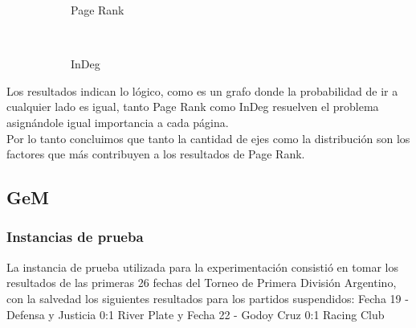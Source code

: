 \begin{figure}[H]
    \centering
    \begin{subfigure}[t]{0.5\textwidth}
      \begin{center}
        Page Rank\\
      \end{center}
    \end{subfigure}%
    ~
    \begin{subfigure}[t]{0.5\textwidth}
      \begin{center}
        InDeg\\
      \end{center}
    \end{subfigure}
\end{figure}

Los resultados indican lo lógico, como es un grafo donde la probabilidad de ir a cualquier lado es igual, tanto Page Rank como InDeg resuelven el problema asignándole igual importancia a cada página.\\
Por lo tanto concluimos que tanto la cantidad de ejes como la distribución son los factores que más contribuyen a los resultados de Page Rank.

\subsection{GeM}

\subsubsection{Instancias de prueba}

La instancia de prueba utilizada para la experimentación consistió en tomar los resultados de las primeras 26 fechas del Torneo de Primera División
Argentino, con la salvedad los siguientes resultados para los partidos suspendidos: Fecha 19 - Defensa y Justicia 0:1 River Plate  y Fecha 22 - Godoy Cruz 0:1 Racing Club  


